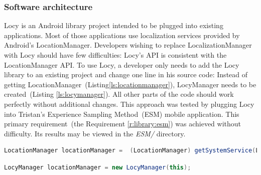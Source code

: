 \subsubsection{Software architecture}
\label{s:design:locy:architecture}
\hspace{10pt}Locy is an Android library project intended to be plugged into existing applications. Most of those applications use localization services provided by Android's LocationManager. Developers wishing to replace LocalizationManager with Locy should have few difficulties: Locy's API is consistent with the LocationManager API. To use Locy, a developer only needs to add the Locy library to an existing project and change one line in his source code: Instead of getting LocationManager\ (Listing\ref{ls:locationmanager}), LocyManager needs to be created\ (Listing \ref{ls:locymanager}). All other parts of the code should work perfectly without additional changes. This approach was tested by plugging Locy into Tristan's Experience Sampling Method\ (ESM) mobile application. This primary requirement\ (the Requirement \ref{r:library:esm}) was achieved without difficulty. Its results may be viewed in the \textit{ESM/} directory.

                 
\begin{lstlisting}[language=Java,
       basicstyle=\ttfamily,
       keywordstyle=\color{blue}\ttfamily,
       stringstyle=\color{red}\ttfamily,
       commentstyle=\color{green}\ttfamily,
      breaklines=true,
      frame=single,    
      label=ls:locationmanager,caption=Localization services with LocationManager.]
LocationManager locationManager =  (LocationManager) getSystemService(LOCATION_SERVICE);
\end{lstlisting}

\begin{lstlisting}[language=Java,
       basicstyle=\ttfamily,
       keywordstyle=\color{blue}\ttfamily,
       stringstyle=\color{red}\ttfamily,
       commentstyle=\color{green}\ttfamily,
      breaklines=true,
      frame=single,    
      label=ls:locymanager,caption=Localization services with LocyManager.]
LocyManager locationManager = new LocyManager(this);
\end{lstlisting}

